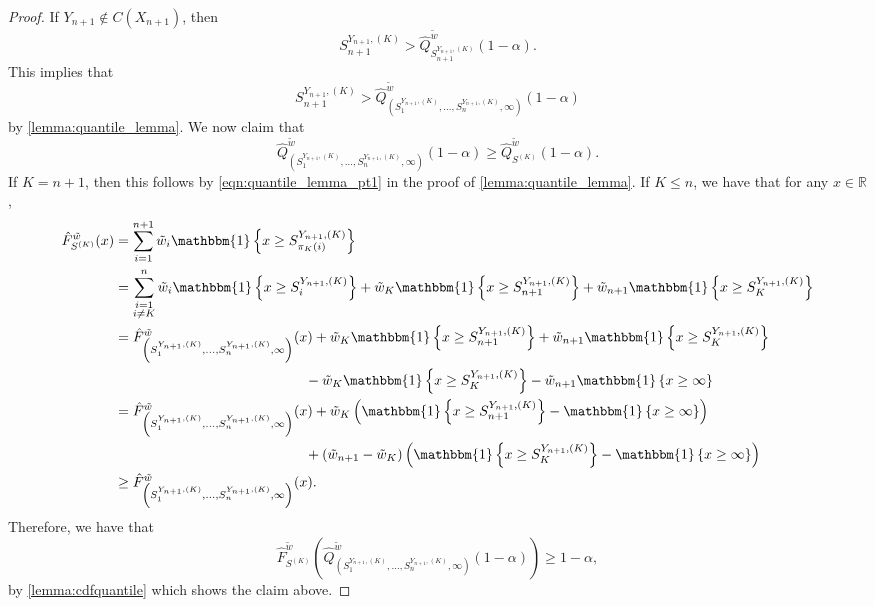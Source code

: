 \documentclass[11pt, titlepage]{article} %
\newcommand{\Ind}[1]{\mathbbm{1}\left\{ #1 \right\}}
\numberwithin{equation}{section}
\theoremstyle{definition}
\numberwithin{theorem}{section}
\numberwithin{lemma}{section}
\numberwithin{corollary}{section}
\numberwithin{proposition}{section}
\numberwithin{definition}{section}
\numberwithin{remark}{section}
\begin{document}
\begin{proof}
    If \(Y_{n+1} \not \in C(X_{n+1})\), then \[S_{n+1}^{Y_{n+1}, (K)} > \hat{Q}^{\tilde{w}}_{S_{n+1}^{Y_{n+1}, (K)}}(1-\alpha).\] This implies that \[S_{n+1}^{Y_{n+1}, (K)} > \hat{Q}^{\tilde{w}}_{\left( S_1^{Y_{n+1}, (K)}, \ldots, S_n^{Y_{n+1}, (K)}, \infty  \right)}(1-\alpha)\] by \cref{lemma:quantile_lemma}. We now claim that \[\hat{Q}^{\tilde{w}}_{\left( S_1^{Y_{n+1}, (K)}, \ldots, S_n^{Y_{n+1}, (K)}, \infty  \right)}(1-\alpha) \geq \hat{Q}^{\tilde{w}}_{S^{(K)}}(1-\alpha).\] If \(K = n+1\), then this follows by \eqref{eqn:quantile_lemma_pt1} in the proof of \cref{lemma:quantile_lemma}. If \(K \leq n\), we have that for any \(x \in \mathbb{R}\), \begin{align*}
        \hat{F}^{\tilde{w}}_{S^{(K)}}(x) &= \sum_{i=1}^{n+1} \tilde{w}_i \Ind{x \geq S_{\pi_K(i)}^{Y_{n+1}, (K)}} \\
        &= \sum_{\substack{i = 1 \\ i \neq K}}^{n} \tilde{w}_i \Ind{x \geq S_i^{Y_{n+1}, (K)}} + \tilde{w}_K \Ind{x \geq S_{n+1}^{Y_{n+1}, (K)}} + \tilde{w}_{n+1} \Ind{x \geq S_K^{Y_{n+1}, (K)}} \\
        &= \hat{F}^{\tilde{w}}_{\left( S_1^{Y_{n+1}, (K)}, \ldots, S_n^{Y_{n+1}, (K)}, \infty  \right)}(x) + \tilde{w}_K \Ind{x \geq S_{n+1}^{Y_{n+1}, (K)}} + \tilde{w}_{n+1} \Ind{x \geq S_K^{Y_{n+1}, (K)}} \\
        & \hspace{4.8cm} -  \tilde{w}_K \Ind{x \geq S_{K}^{Y_{n+1}, (K)}} - \tilde{w}_{n+1} \Ind{x \geq \infty} \\
        &= \hat{F}^{\tilde{w}}_{\left( S_1^{Y_{n+1}, (K)}, \ldots, S_n^{Y_{n+1}, (K)}, \infty  \right)}(x) + \tilde{w}_K \left( \Ind{x \geq S_{n+1}^{Y_{n+1}, (K)}} - \Ind{x \geq \infty} \right) \\
        & \hspace{4.8cm} + \left( \tilde{w}_{n+1} - \tilde{w}_K\right) \left(\Ind{x \geq S_{K}^{Y_{n+1}, (K)}} - \Ind{x \geq \infty} \right) \\
        & \geq \hat{F}^{\tilde{w}}_{\left( S_1^{Y_{n+1}, (K)}, \ldots, S_n^{Y_{n+1}, (K)}, \infty  \right)}(x).
    \end{align*}
    Therefore, we have that \[\hat{F}^{\tilde{w}}_{S^{(K)}}\left( \hat{Q}^{\tilde{w}}_{\left( S_1^{Y_{n+1}, (K)}, \ldots, S_n^{Y_{n+1}, (K)}, \infty  \right)}(1-\alpha) \right) \geq 1-\alpha,\] by \cref{lemma:cdfquantile} which shows the claim above. \vskip5pt


\end{proof}
\end{document}
